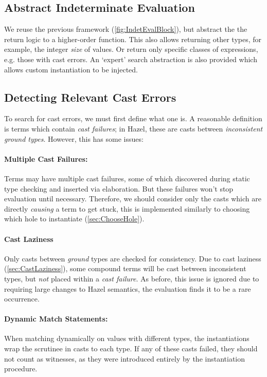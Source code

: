 \subsection{Abstract Indeterminate Evaluation}
\label{sec:AbstractSearch}
We reuse the previous framework (\cref{fig:IndetEvalBlock}), but abstract the the return logic to a higher-order  function. This also allows returning other types, for example, the integer \textit{size} of values. Or return only specific classes of expressions, e.g. those with cast errors. An `expert' search abstraction is also provided which allows custom instantiation to be injected.

\subsection{Detecting Relevant Cast Errors}
\label{sec:CastFailureDetection}
To search for cast errors, we must first define what one is. A reasonable definition is terms which contain \textit{cast failures}; in Hazel, these are casts between \textit{inconsistent ground types}. However, this has some issues:

\paragraph{Multiple Cast Failures:} Terms may have multiple cast failures, some of which discovered during static type checking and inserted via elaboration. But these failures won't stop evaluation until necessary. Therefore, we should consider only the casts which are directly \textit{causing} a term to get stuck, this is implemented similarly to choosing which hole to instantiate (\cref{sec:ChooseHole}).

\paragraph{Cast Laziness}
\label{sec:SearchCastLaziness}
Only casts between \textit{ground} types are checked for consistency. Due to cast laziness (\cref{sec:CastLaziness}), some compound terms will be cast between inconsistent types, but \textit{not} placed within a \textit{cast failure}. As before, this issue is ignored due to requiring large changes to Hazel semantics, the evaluation finds it to be a rare occurrence.

\paragraph{Dynamic Match Statements:} When matching dynamically on values with different types, the instantiations wrap the scrutinee in casts to each type. If any of these casts failed, they should not count as witnesses, as they were introduced entirely by the instantiation procedure. 


